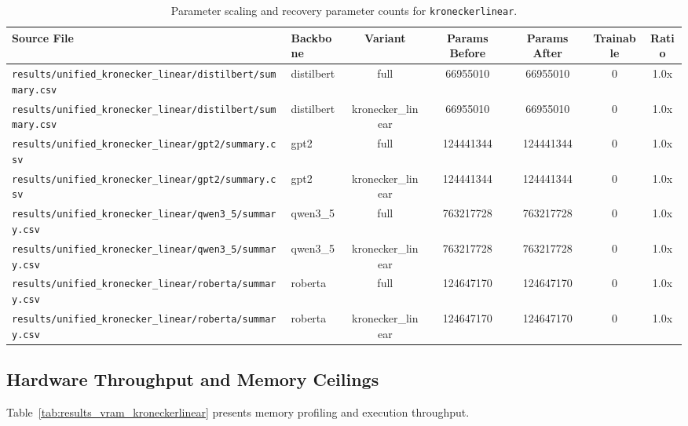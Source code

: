 \begin{table}[t]
\centering
\small
\begin{tabular}{llccccc}
\toprule
\textbf{Source File} & \textbf{Backbone} & \textbf{Variant} & \textbf{Params Before} & \textbf{Params After} & \textbf{Trainable} & \textbf{Ratio} \\
\midrule
\texttt{results/unified\_kronecker\_linear/distilbert/summary.csv} & distilbert & full & 66955010 & 66955010 & 0 & 1.0x \\
\texttt{results/unified\_kronecker\_linear/distilbert/summary.csv} & distilbert & kronecker\_linear & 66955010 & 66955010 & 0 & 1.0x \\
\texttt{results/unified\_kronecker\_linear/gpt2/summary.csv} & gpt2 & full & 124441344 & 124441344 & 0 & 1.0x \\
\texttt{results/unified\_kronecker\_linear/gpt2/summary.csv} & gpt2 & kronecker\_linear & 124441344 & 124441344 & 0 & 1.0x \\
\texttt{results/unified\_kronecker\_linear/qwen3\_5/summary.csv} & qwen3\_5 & full & 763217728 & 763217728 & 0 & 1.0x \\
\texttt{results/unified\_kronecker\_linear/qwen3\_5/summary.csv} & qwen3\_5 & kronecker\_linear & 763217728 & 763217728 & 0 & 1.0x \\
\texttt{results/unified\_kronecker\_linear/roberta/summary.csv} & roberta & full & 124647170 & 124647170 & 0 & 1.0x \\
\texttt{results/unified\_kronecker\_linear/roberta/summary.csv} & roberta & kronecker\_linear & 124647170 & 124647170 & 0 & 1.0x \\
\bottomrule
\end{tabular}
\caption{Parameter scaling and recovery parameter counts for \texttt{kroneckerlinear}.}
\label{tab:results_params_kroneckerlinear}
\end{table}

\subsection{Hardware Throughput and Memory Ceilings}
Table~\ref{tab:results_vram_kroneckerlinear} presents memory profiling and execution throughput.

